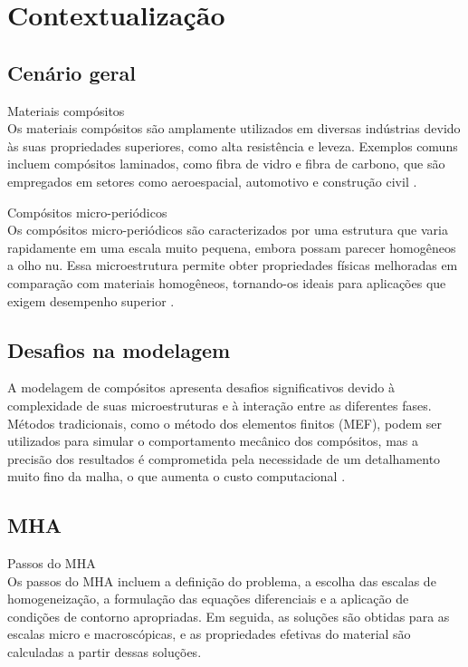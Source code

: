 \section{Contextualização}

\subsection{Cenário geral}
{Materiais compósitos}\\
Os materiais compósitos são amplamente utilizados em diversas indústrias devido às suas propriedades superiores, como alta resistência e leveza. Exemplos comuns incluem compósitos laminados, como fibra de vidro e fibra de carbono, que são empregados em setores como aeroespacial, automotivo e construção civil \cite{silva2019}.


{Compósitos micro-periódicos}\\
Os compósitos micro-periódicos são caracterizados por uma estrutura que varia rapidamente em uma escala muito pequena, embora possam parecer homogêneos a olho nu. Essa microestrutura permite obter propriedades físicas melhoradas em comparação com materiais homogêneos, tornando-os ideais para aplicações que exigem desempenho superior \cite{pereira2021}.

\subsection{Desafios na modelagem}
A modelagem de compósitos apresenta desafios significativos devido à complexidade de suas microestruturas e à interação entre as diferentes fases. Métodos tradicionais, como o método dos elementos finitos (MEF), podem ser utilizados para simular o comportamento mecânico dos compósitos, mas a precisão dos resultados é comprometida pela necessidade de um detalhamento muito fino da malha, o que aumenta o custo computacional \cite{oliveira2020}.

\subsection{MHA}

{Passos do MHA}\\
Os passos do MHA incluem a definição do problema, a escolha das escalas de homogeneização, a formulação das equações diferenciais e a aplicação de condições de contorno apropriadas. Em seguida, as soluções são obtidas para as escalas micro e macroscópicas, e as propriedades efetivas do material são calculadas a partir dessas soluções.

